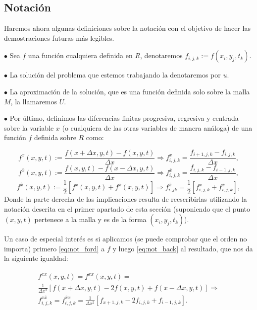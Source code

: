 \subsection{Notación}\label{sec:notacion}
Haremos ahora algunas definiciones sobre la notación con el objetivo de hacer las demostraciones futuras más legibles.

	$\bullet$ Sea $f$ una función cualquiera definida en $R$, denotaremos $f_{i,j,k}:= f(x_i,y_j,t_k)$.
	
	$\bullet$ La solución del problema que estemos trabajando la denotaremos por $u$.
	
	$\bullet$ La aproximación de la solución, que es una función definida solo sobre la malla $M$, la llamaremos $U$.
	
	$\bullet$ Por último, definimos las diferencias finitas progresiva, regresiva y centrada sobre la variable $x$ (o cualquiera de las otras variables de manera análoga) de una función $f$ definida sobre $R$ como:
	

\begin{equation}
	\label{eq:not_ford}
	f^{x}(x,y,t) := \frac{f(x+\Delta x,y,t)-f(x,y,t)}{\Delta x} \Rightarrow f^{x}_{i,j,k} = \frac{f_{i+1,j,k}-f_{i,j,k}}{\Delta x},
\end{equation}
\begin{equation}
	\label{eq:not_back}
	f^{\bar{x}}(x,y,t) := \frac{f(x,y,t)-f(x-\Delta x,y,t)}{\Delta x} \Rightarrow
	f^{\bar{x}}_{i,j,k} = \frac{f_{i,j,k}-f_{i-1,j,k}}{\Delta x},
\end{equation}
\begin{equation}
	\label{eq:not_center}
	f^{\hat{x}}(x,y,t):= \frac{1}{2}[f^{x}(x,y,t)+f^{\bar{x}}(x,y,t)]\Rightarrow
	f^{\hat{x}}_{i,jk} = \frac{1}{2}[f^{x}_{i,j,k}+f^{\bar{x}}_{i,j,k}],
\end{equation}
Donde la parte derecha de las implicaciones resulta de reescribirlas utilizando la notación descrita en el primer apartado de esta sección (suponiendo que el punto $(x,y,t)$ pertenece a la malla y es de la forma $(x_i,y_j,t_k)$).

Un caso de especial interés es si aplicamos (se puede comprobar que el orden no importa) primero \eqref{eq:not_ford} a $f$ y luego \eqref{eq:not_back} al resultado, que nos da la siguiente igualdad:

\begin{gather}
	\label{eq:not_second}
	f^{x\bar{x}}(x,y,t) = f^{\bar{x}x}(x,y,t) = \\
	\frac{1}{\Delta x^2}[f(x+\Delta x,y,t) - 2f(x,y,t)+f(x-\Delta x,y,t)] \Rightarrow \\
	f^{x\bar{x}}_{i,j,k} = f^{\bar{x}x}_{i,j,k} = \frac{1}{\Delta x^2}[f_{x+1,j,k} - 2f_{i,j,k}+f_{i-1,j,k}].
\end{gather}

